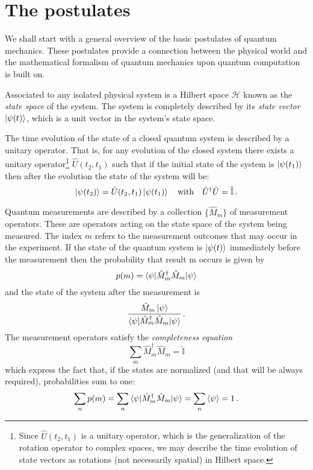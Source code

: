 \section{The postulates}
We shall start with a general overview of the basic postulates of quantum mechanics. These postulates provide a connection between the physical world and the mathematical formalism of quantum mechanics upon quantum computation is built on.
\begin{postulate}\label{postulate:1}
Associated to any isolated physical system is a Hilbert space $\mathcal{H}$ known as the \emph{state space} of the
system. The system is completely described by its \emph{state vector} $\ket{\psi(t)}$, which is a unit
vector in the system’s state space.
\end{postulate}
\begin{postulate}\label{postulate:2}
The time evolution of the state of a closed quantum system is described by a
unitary operator. That is, for any evolution of the closed system there exists
a unitary operator\footnote{Since $\widehat{U}(t_2,t_1)$ is a unitary operator, which is the generalization of the rotation operator to complex spaces, we may describe the time evolution of state vectors as rotations (not necessarily spatial) in Hilbert space.} $\widehat{U}(t_2,t_1)$ such that if the initial state of the system is $\ket{\psi(t_1)}$ then
after the evolution the state of the system will be:
\begin{equation*}
    \ket{\psi(t_2)} = \hat{U}(t_2,t_1) \ket{\psi(t_1)} \quad \text{with} \quad \hat{U}^\dagger\hat{U} = \hat{\mathbb{I}}\,.
\end{equation*}
\end{postulate}
\begin{postulate}\label{postulate:3}
Quantum measurements are described by a collection $\{\hat{M}_m\}$ of
measurement operators. These are operators acting on the state space of the
system being measured. The index $m$ refers to the measurement outcomes that
may occur in the experiment. If the state of the quantum system is $\ket{\psi(t)}$
immediately before the measurement then the probability that result m occurs is given by
\begin{equation*}
    p(m) = \braket{ \psi | \hat{M}^\dagger_m \hat{M}_m | \psi}
\end{equation*}
and the state of the system after the measurement is
\begin{equation*}
    \frac{\hat{M}_m\ket{\psi}}{\braket{\psi | \hat{M}^\dagger_m \hat{M}_m | \psi}}\,.
\end{equation*}
The measurement operators satisfy the \emph{completeness equation}
\begin{equation*}
    \sum_m \hat{M}_m^\dagger \hat{M}_m = \hat{\mathbb{I}}
\end{equation*}
which express the fact that, if the states are normalized (and that will be always required), probabilities sum to one: 
    \begin{equation}\label{eq:normalization}
    \sum_n p(m) = \sum_n \braket{ \psi | \hat{M}^\dagger_m \hat{M}_m | \psi} = \sum_n \braket{\psi} = 1\,.
    \end{equation}
\end{postulate} 
